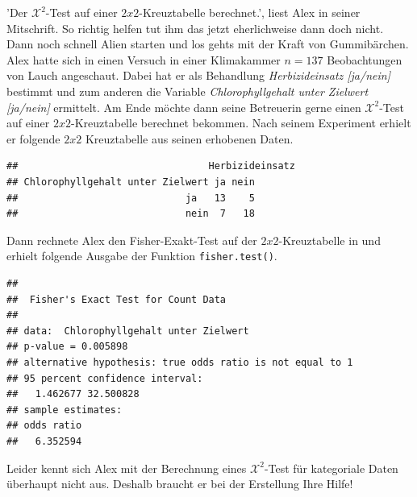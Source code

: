 \documentclass[a4paper, 9pt]{scrartcl}\usepackage[]{graphicx}\usepackage[]{xcolor}
\makeatletter
\newenvironment{kframe}{%
 \def\at@end@of@kframe{}%
 \ifinner\ifhmode%
  \def\at@end@of@kframe{\end{minipage}}%
  \begin{minipage}{\columnwidth}%
 \fi\fi%
 \def\FrameCommand##1{\hskip\@totalleftmargin \hskip-\fboxsep
 \colorbox{shadecolor}{##1}\hskip-\fboxsep
     \hskip-\linewidth \hskip-\@totalleftmargin \hskip\columnwidth}%
 \MakeFramed {\advance\hsize-\width
   \@totalleftmargin\z@ \linewidth\hsize
   \@setminipage}}%
 {\par\unskip\endMakeFramed%
 \at@end@of@kframe}
\newenvironment{knitrout}{}{} %
\makeatother
\begin{document}
'Der $\mathcal{X}^2$-Test auf einer $2x2$-Kreuztabelle berechnet.', liest Alex in seiner Mitschrift. So richtig helfen tut ihm das jetzt eherlichweise dann doch nicht. Dann noch schnell Alien starten und los gehts mit der Kraft von Gummibärchen. Alex hatte sich in einen Versuch in einer Klimakammer $n = 137$ Beobachtungen von Lauch angeschaut. Dabei hat er als Behandlung \textit{Herbizideinsatz [ja/nein]} bestimmt und zum anderen die Variable \textit{Chlorophyllgehalt unter Zielwert [ja/nein]} ermittelt. Am Ende möchte dann seine Betreuerin gerne einen $\mathcal{X}^2$-Test auf einer $2x2$-Kreuztabelle berechnet bekommen. Nach seinem Experiment erhielt er folgende $2x2$ Kreuztabelle aus seinen erhobenen Daten.

\begin{knitrout}
\color{fgcolor}\begin{kframe}
\begin{verbatim}
##                                 Herbizideinsatz
## Chlorophyllgehalt unter Zielwert ja nein
##                             ja   13    5
##                             nein  7   18
\end{verbatim}
\end{kframe}
\end{knitrout}

Dann rechnete Alex den Fisher-Exakt-Test auf der $2x2$-Kreuztabelle in \Rlogo und erhielt folgende \Rlogo Ausgabe der Funktion \texttt{fisher.test()}.

\begin{knitrout}
\color{fgcolor}\begin{kframe}
\begin{verbatim}
## 
## 	Fisher's Exact Test for Count Data
## 
## data:  Chlorophyllgehalt unter Zielwert
## p-value = 0.005898
## alternative hypothesis: true odds ratio is not equal to 1
## 95 percent confidence interval:
##   1.462677 32.500828
## sample estimates:
## odds ratio 
##   6.352594
\end{verbatim}
\end{kframe}
\end{knitrout}

Leider kennt sich Alex mit der Berechnung eines $\mathcal{X}^2$-Test für kategoriale Daten überhaupt nicht aus. Deshalb braucht er bei der Erstellung Ihre Hilfe!
\end{document}
